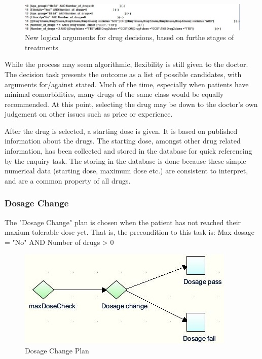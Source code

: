 \documentclass[11pt]{article}
\begin{document}
\begin{figure}[ht]
\begin{center}
\includegraphics[scale=0.8]{tallisDrugArg2}
\caption{New logical arguments for drug decisions, based on furthe stages of treatments}
\label{fig:tallisDrugArg2}
\end{center}
\end{figure}

While the process may seem algorithmic, flexibility is still given to the doctor.  The decision task presents the outcome as a list of possible candidates, with arguments for/against stated.  Much of the time, especially when patients have minimal comorbidities, many drugs of the same class would be equally recommended.  At this point, selecting the drug may be down to the doctor's own judgement on other issues such as price or experience.  

After the drug is selected, a starting dose is given. It is based on published information about the drugs\cite{CKS}.   The starting dose, amongst other drug related information, has been collected and stored in the database for quick referencing by the enquiry task. The storing in the database is done because these simple numerical data (starting dose, maximum dose etc.) are consistent to interpret, and are a common property of all drugs.  

\subsubsection{Dosage Change}
The "Dosage Change" plan is chosen when the patient has not reached their maxium tolerable dose yet.  That is, the precondition to this task is: Max dosage = "No" AND Number of drugs  > 0
\begin{figure}[ht]
\begin{center}
\includegraphics[scale=1]{tallisDoseChange}
\caption{Dosage Change Plan}
\label{fig:tallisDoseChange}
\end{center}
\end{figure}
\end{document}
